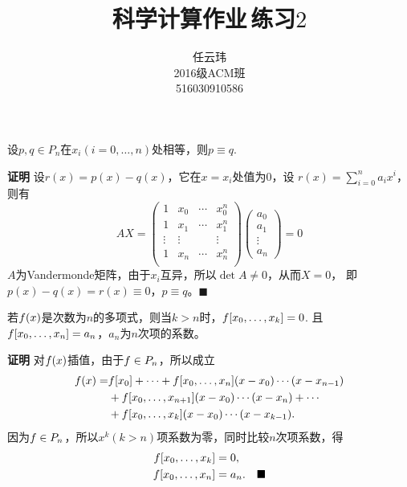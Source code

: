 

\title{科学计算作业$\,$练习$2$}
\author{\small 任云玮\\\small2016级ACM班\\\small516030910586}
\date{}


\maketitle

\begin{thm}[唯一性]
  \label{thm1}
  设$p, q\in P_n$在$x_i(i=0,\dots,n)$处相等，则$p\equiv q$.
\end{thm}
\textbf{证明 }
  设$r(x) = p(x) - q(x)$，它在$x=x_i$处值为$0$，设
  $r(x) = \sum_{i=0}^na_ix^i$，则有
  \[
    AX =
    \begin{pmatrix}
      1 & x_0 & \cdots & x_0^n \\
      1 & x_1 & \cdots & x_1^n \\
      \vdots & \vdots & & \vdots \\
      1 & x_n & \cdots & x_n^n \\
    \end{pmatrix}
    \begin{pmatrix}
      a_0 \\
      a_1 \\
      \vdots \\
      a_n
    \end{pmatrix} = 0
  \]
  $A$为Vandermonde矩阵，由于$x_i$互异，所以$\det A\ne0$，从而$X=0$，
  即$p(x) - q(x) = r(x)\equiv 0$，$p\equiv q$。$\blacksquare$

\begin{lemma}
  \label{lemma2}
  若$\mathnormal{f}(x)$是次数为$n$的多项式，则当$k>n$时，$\mathnormal{f}[x_0,\dots,x_k] = 0$.
  且$\mathnormal{f}[x_0,\dots,x_n] = a_n$，$a_n$为$n$次项的系数。
\end{lemma}
\textbf{证明 }
  对$\mathnormal{f}(x)$插值，由于$\mathnormal{f}\in P_n$，所以成立
  \[\begin{split}
    \mathnormal{f}(x) =& \mathnormal{f}[x_0] + \cdots + \mathnormal{f}[x_0,\dots,x_n](x-x_0)\cdots(x-x_{n-1}) \\
    &+ \mathnormal{f}[x_0,\dots,x_{n+1}](x-x_0)\cdots(x-x_n) + \cdots \\
    &+ \mathnormal{f}[x_0,\dots,x_k](x-x_0)\cdots(x-x_{k-1}).
  \end{split}\]
  因为$\mathnormal{f}\in P_n$，所以$x^k(k>n)$项系数为零，同时比较$n$次项系数，得
  \[\begin{split}
    \mathnormal{f}[x_0,\dots,x_k] &= 0,\\
    \mathnormal{f}[x_0,\dots,x_n] &= a_n.\quad\blacksquare
  \end{split}\]

